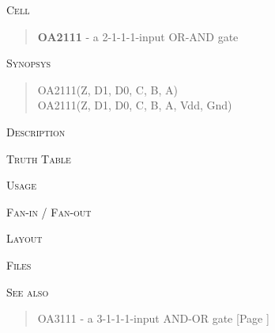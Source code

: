
\label{OA2111}
\textsc{Cell}
\begin{quote}
    \textbf{OA2111} - a 2-1-1-1-input OR-AND gate
\end{quote}

\textsc{Synopsys}
\begin{quote}
    OA2111(Z, D1, D0, C, B, A) \\
    OA2111(Z, D1, D0, C, B, A, Vdd, Gnd)
\end{quote}

\textsc{Description}

%

\textsc{Truth Table}


\textsc{Usage}

\textsc{Fan-in / Fan-out}

\textsc{Layout}

\textsc{Files}

\textsc{See also}
\begin{quote}
    OA3111 - a 3-1-1-1-input AND-OR gate [Page \pageref{OA3111}]
\end{quote}
